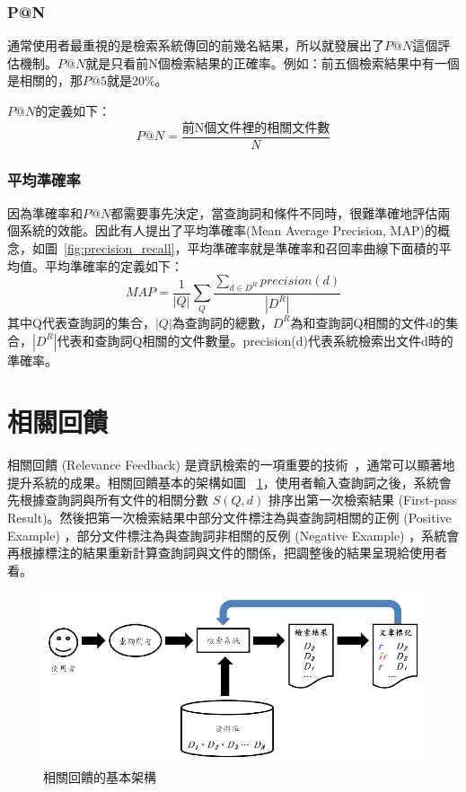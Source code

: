 \subsubsection{P@N}

通常使用者最重視的是檢索系統傳回的前幾名結果，所以就發展出了$P@N$這個評估機制。$P@N$就是只看前N個檢索結果的正確率。例如：前五個檢索結果中有一個是相關的，那$P@5$就是20\%。

$P@N$的定義如下：
\[
P@N=\frac{\text{前N個文件裡的相關文件數}}{N}
\]

\subsubsection{平均準確率~\cite{garofolo2000trec}}

因為準確率和$P@N$都需要事先決定，當查詢詞和條件不同時，很難準確地評估兩個系統的效能。因此有人提出了平均準確率(Mean Average Precision, MAP)的概念，如圖~\ref{fig:precision_recall}，平均準確率就是準確率和召回率曲線下面積的平均值。平均準確率的定義如下：
\begin{equation}
MAP = \frac{1}{|Q|} \sum_Q \frac{\sum_{d \in D^R}precision(d)}{|D^R|}
\end{equation}
其中Q代表查詢詞的集合，$|Q|$為查詢詞的總數，$D^R$為和查詢詞Q相關的文件d的集合，$|D^R|$代表和查詢詞Q相關的文件數量。precision(d)代表系統檢索出文件d時的準確率。

\section{相關回饋}
相關回饋 (Relevance Feedback) 是資訊檢索的一項重要的技術~\cite{ruthven2003survey}，通常可以顯著地提升系統的成果。相關回饋基本的架構如圖 ~\ref{fig:chap2_prf}，使用者輸入查詢詞之後，系統會先根據查詢詞與所有文件的相關分數 $S(Q, d)$ 排序出第一次檢索結果 (First-pass Result)。然後把第一次檢索結果中部分文件標注為與查詢詞相關的正例 (Positive Example) ，部分文件標注為與查詢詞非相關的反例 (Negative Example)
，系統會再根據標注的結果重新計算查詢詞與文件的關係，把調整後的結果呈現給使用者看。
\begin{figure}
\centering
\includegraphics[scale=0.7]{images/chap2_prf.png}
\caption{相關回饋的基本架構} \label{fig:chap2_prf}
\end{figure}


